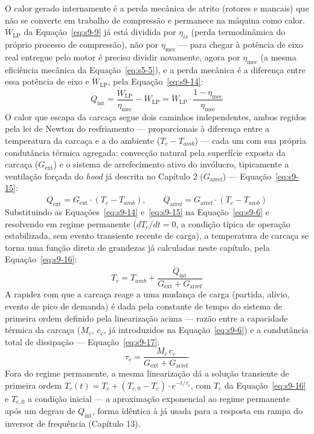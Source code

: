 \documentclass[12pt,a4paper]{article}
\numberwithin{equation}{section}
\numberwithin{table}{section}
\numberwithin{figure}{section}
\begin{document}
{	O calor gerado internamente é a perda mecânica de atrito (rotores e mancais) que não se converte em trabalho de compressão e permanece na máquina como calor. $\dot{W}_{\text{LP}}$ da Equação~\eqref{eq:s9-9} já está dividida por $\eta_{is}$ (perda termodinâmica do próprio processo de compressão), não por $\eta_{\text{mec}}$ — para chegar à potência de eixo real entregue pelo motor é preciso dividir novamente, agora por $\eta_{\text{mec}}$ (a mesma eficiência mecânica da Equação~\eqref{eq:s5-5}), e a perda mecânica é a diferença entre essa potência de eixo e $\dot{W}_{\text{LP}}$, pela Equação~\eqref{eq:s9-14}:
	\begin{equation}\label{eq:s9-14}
 \dot{Q}_{\text{int}} = \frac{\dot{W}_{\text{LP}}}{\eta_{\text{mec}}} - \dot{W}_{\text{LP}} = \dot{W}_{\text{LP}} \cdot \frac{1 - \eta_{\text{mec}}}{\eta_{\text{mec}}}
\end{equation}
	O calor que escapa da carcaça segue dois caminhos independentes, ambos regidos pela lei de Newton do resfriamento — proporcionais à diferença entre a temperatura da carcaça e a do ambiente ($T_c - T_{amb}$) — cada um com sua própria condutância térmica agregada: convecção natural pela superfície exposta da carcaça ($G_{\text{ext}}$) e o sistema de arrefecimento ativo do invólucro, tipicamente a ventilação forçada do \textit{hood} já descrita no Capítulo 2 ($G_{\text{arref}}$) — Equação~\eqref{eq:s9-15}:
	\begin{equation}\label{eq:s9-15}
 \dot{Q}_{\text{ext}} = G_{\text{ext}} \cdot (T_c - T_{amb}), \qquad
 \dot{Q}_{\text{arref}} = G_{\text{arref}} \cdot (T_c - T_{amb})
\end{equation}
	Substituindo as Equações~\eqref{eq:s9-14} e~\eqref{eq:s9-15} na Equação~\eqref{eq:s9-6} e resolvendo em regime permanente ($dT_c/dt=0$, a condição típica de operação estabilizada, sem evento transiente recente de carga), a temperatura de carcaça se torna uma função direta de grandezas já calculadas neste capítulo, pela Equação~\eqref{eq:s9-16}:
	\begin{equation}\label{eq:s9-16}
 T_{c} = T_{amb} + \frac{\dot{Q}_{\text{int}}}{G_{\text{ext}} + G_{\text{arref}}}
\end{equation}
	A rapidez com que a carcaça reage a uma mudança de carga (partida, alívio, evento de pico de demanda) é dada pela constante de tempo do sistema de primeira ordem definido pela linearização acima — razão entre a capacidade térmica da carcaça ($M_c$, $c_c$, já introduzidos na Equação~\eqref{eq:s9-6}) e a condutância total de dissipação — Equação~\eqref{eq:s9-17}:
	\begin{equation}\label{eq:s9-17}
 \tau_c = \frac{M_c \, c_c}{G_{\text{ext}} + G_{\text{arref}}}
\end{equation}
	Fora do regime permanente, a mesma linearização dá a solução transiente de primeira ordem $T_c(t) = T_{c} + (T_{c,0} - T_{c}) \cdot e^{-t/\tau_c}$, com $T_c$ da Equação~\eqref{eq:s9-16} e $T_{c,0}$ a condição inicial — a aproximação exponencial ao regime permanente após um degrau de $\dot{Q}_{\text{int}}$, forma idêntica à já usada para a resposta em rampa do inversor de frequência (Capítulo 13).

}
\end{document}
